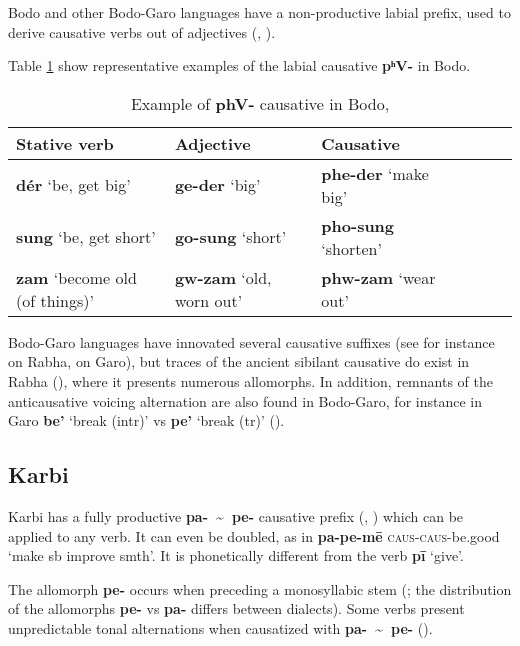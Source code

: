\documentclass[oneside,a4paper,11pt]{article}
\newcommand{\ipa}[1]{\textbf{{\phon\mbox{#1}}}} %
\newcommand{\forme}[2]{\ipa{#1} `#2'}
\newcommand{\tld}{\textasciitilde{}}
\begin{document}
Bodo and other Bodo-Garo languages have a non-productive labial prefix, used to derive causative verbs out of adjectives (\citealt[90]{mazo04st}, \citealt{delancey15adjectival}).

Table \ref{tab:bodo.phV} show representative examples of the labial causative  \ipa{pʰV-} in Bodo.

\begin{table}[H]
\caption{Example of \ipa{phV-} causative in Bodo, \citet[54]{delancey15adjectival}} \label{tab:bodo.phV}
\begin{tabular}{lllllll}
\toprule
Stative verb & Adjective & Causative \\
\midrule
\forme{dér}{be, get big} & \forme{ge-der}{big} & \forme{phe-der}{make big} \\
\forme{sung}{be, get short} & \forme{go-sung}{short} & \forme{pho-sung}{shorten} \\
\forme{zam}{become old (of things)} & \forme{gw-zam}{old, worn out} & \forme{phw-zam}{wear out} \\
\bottomrule
\end{tabular}
\end{table}

Bodo-Garo languages have innovated several causative suffixes (see for instance \citealt[192-4]{joseph07rabha} on Rabha, \citealt[142]{burling04mandi} on Garo), but traces of the ancient sibilant causative do exist in Rabha (\citealt[196-201]{joseph07rabha}), where it presents numerous allomorphs. In addition, remnants of the anticausative voicing alternation are also found in Bodo-Garo, for instance in Garo \ipa{be'} `break (intr)' vs \ipa{pe'} `break (tr)' (\citealt[112-3]{burling04mandi}). 

\subsection{Karbi} \label{sec:karbi}
Karbi has a fully productive \ipa{pa- \tld{} pe-} causative prefix (\citealt[93-4]{gruessner78mikir}, \citealt[238-9]{konnerth14karbi}) which can be applied to any verb. It can even be doubled, as in \ipa{pa-pe-mē} \textsc{caus-caus}-be.good `make sb improve smth'. It is phonetically different from the verb \ipa{pī} `give'.

The allomorph \ipa{pe-} occurs when preceding a monosyllabic stem (\citealt[105]{konnerth14karbi}; the distribution of the allomorphs \ipa{pe-} vs \ipa{pa-} differs between dialects). Some verbs present unpredictable tonal alternations when causatized with \ipa{pa- \tld{} pe-} (\citealt[103]{konnerth14karbi}). 
\end{document}
